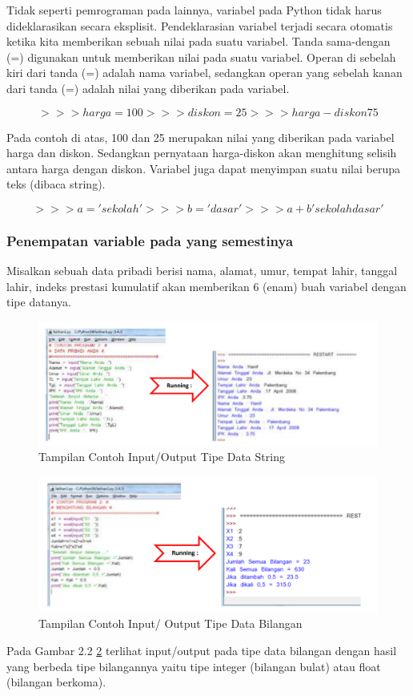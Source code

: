 Tidak seperti pemrograman pada lainnya, variabel pada Python tidak harus dideklarasikan secara eksplisit. Pendeklarasian variabel terjadi secara otomatis ketika kita memberikan sebuah nilai pada suatu variabel. Tanda sama-dengan (=) digunakan untuk memberikan nilai pada suatu variabel. Operan di sebelah kiri dari tanda (=) adalah nama variabel, sedangkan operan yang sebelah kanan dari tanda (=) adalah nilai yang diberikan pada variabel.\cite{utamipemrograman}

\begin{equation}
>>>harga = 100
>>>diskon = 25
>>>harga - diskon
75
\end{equation}

Pada contoh di atas, 100 dan 25 merupakan nilai yang diberikan pada variabel harga dan diskon. Sedangkan pernyataan harga-diskon akan menghitung selisih antara harga dengan diskon. Variabel juga dapat menyimpan suatu nilai berupa teks (dibaca string).

\begin{equation}
>>>a = 'sekolah'
>>>b = 'dasar'
>>>a + b
'sekolahdasar'
\end{equation}

\subsubsection{Penempatan variable pada yang semestinya}
Misalkan sebuah data pribadi berisi nama, alamat, umur, tempat lahir, tanggal lahir, indeks prestasi kumulatif akan memberikan 6 (enam) buah variabel dengan tipe datanya.
\begin{figure}[ht]
	\centerline{\includegraphics[width=1\textwidth]{figures/tipedatastring.png}}
	\caption{Tampilan Contoh Input/Output Tipe Data String}
	\label{tipedatastring}
	\end{figure}

\begin{figure}[ht]
	\centerline{\includegraphics[width=1\textwidth]{figures/tipedatabilangan.png}}
	\caption{Tampilan Contoh Input/ Output Tipe Data Bilangan}
	\label{tipedatabilangan}
	\end{figure}

Pada Gambar 2.2 \ref{tipedatabilangan} terlihat input/output pada tipe data bilangan dengan hasil yang berbeda tipe bilangannya yaitu tipe integer (bilangan bulat) atau float (bilangan berkoma).\cite{irfani2016bahan}
